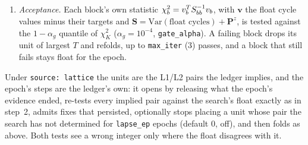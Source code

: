 \documentclass[main.tex]{subfiles}
\begin{document}
\begin{enumerate}[leftmargin=*, itemsep=0pt]
  The stations of a block are touched by no other block, so the corrections
  add exactly across blocks.  $\bm{P}^z$ is diagonal, so $\bm{A}$ is as sparse
  as the overlap of the rows' stations and is factored by a sparse
  $LDL^{\Tr}$ after a Jacobi equilibration.  Two screens guard a block:
  $\bm{B}$ alone is singular exactly when the rows are linearly dependent,
  whatever the hold, and then $\bm{A}$.  A refused float reproduction, a
  non-finite held estimate, or a shift of the shared estimate above
  \texttt{max\_shift\_m} ($\SI{0.5}{m}$) on any column leaves the epoch float,
  counted.
\item \emph{Acceptance.}  Each block's own statistic
  $\chi^2_b = v_b^{T}S_{bb}^{-1}v_b$, with $\bm{v}$ the float
  cycle values minus their targets and
  $\bm{S} = \mathrm{Var}(\text{float cycles}) + \bm{P}^z$, is tested against the
  $1-\alpha_g$ quantile of $\chi^2_K$ ($\alpha_g = 10^{-4}$,
  \texttt{gate\_alpha}).  A failing block drops its unit of largest $T$ and
  refolds, up to \texttt{max\_iter} (3) passes, and a block that still fails
  stays float for the epoch.
\end{enumerate}
Under \texttt{source: lattice} the units are the L1/L2 pairs the ledger implies,
and the epoch's steps are the ledger's own: it opens by releasing what the
epoch's evidence ended, re-tests every implied pair against the search's float
exactly as in step~2, admits fixes that persisted, optionally stops placing a
unit whose pair the search has not determined for \texttt{lapse\_ep} epochs
(default 0, off), and then folds as above.  Both tests see a wrong integer only
where the float disagrees with it.
\end{document}
